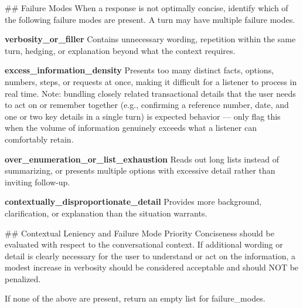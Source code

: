 \begin{tcolorbox}[promptbox, title={\small Conciseness Prompt}]
      \#\# Failure Modes\newline
      When a response is not optimally concise, identify which of the following failure modes are present. A turn may have multiple failure modes.\newline

      \textbf{verbosity\_or\_filler}\newline
      Contains unnecessary wording, repetition within the same turn, hedging, or explanation beyond what the context requires.\newline

      \textbf{excess\_information\_density}\newline
      Presents too many distinct facts, options, numbers, steps, or requests at once, making it difficult for a listener to process in real time. Note: bundling closely related transactional details that the user needs to act on or remember together (e.g., confirming a reference number, date, and one or two key details in a single turn) is expected behavior --- only flag this when the volume of information genuinely exceeds what a listener can comfortably retain.\newline

      \textbf{over\_enumeration\_or\_list\_exhaustion}\newline
      Reads out long lists instead of summarizing, or presents multiple options with excessive detail rather than inviting follow-up.\newline

      \textbf{contextually\_disproportionate\_detail}\newline
      Provides more background, clarification, or explanation than the situation warrants.\newline

      \#\# Contextual Leniency and Failure Mode Priority\newline
      Conciseness should be evaluated with respect to the conversational context. If additional wording or detail is clearly necessary for the user to understand or act on the information, a modest increase in verbosity should be considered acceptable and should NOT be penalized.\newline

      If none of the above are present, return an empty list for failure\_modes.\newline


\end{tcolorbox}
